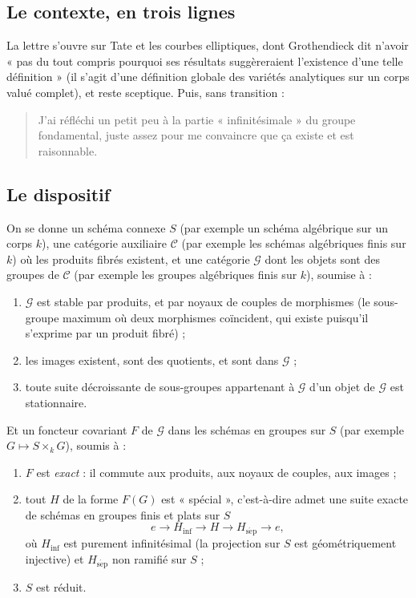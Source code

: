\documentclass[11pt,a4paper]{article}
\begin{document}
\subsection*{Le contexte, en trois lignes}

La lettre s'ouvre sur Tate et les courbes elliptiques, dont Grothendieck dit
n'avoir « pas du tout compris pourquoi ses résultats suggèreraient l'existence
d'une telle définition » (il s'agit d'une définition globale des variétés
analytiques sur un corps valué complet), et reste sceptique. Puis, sans
transition :

\begin{quote}
J'ai réfléchi un petit peu à la partie « infinitésimale » du groupe
fondamental, juste assez pour me convaincre que ça existe et est raisonnable.
\end{quote}

\subsection*{Le dispositif}

On se donne un schéma connexe $S$ (par exemple un schéma algébrique sur un
corps $k$), une catégorie auxiliaire $\mathcal{C}$ (par exemple les schémas
algébriques finis sur $k$) où les produits fibrés existent, et une catégorie
$\mathcal{G}$ dont les objets sont des groupes de $\mathcal{C}$ (par exemple
les groupes algébriques finis sur $k$), soumise à :

\begin{enumerate}
  \item[(i)] $\mathcal{G}$ est stable par produits, et par noyaux de couples de
    morphismes (le sous-groupe maximum où deux morphismes coïncident, qui
    existe puisqu'il s'exprime par un produit fibré) ;
  \item[(ii)] les images existent, sont des quotients, et sont dans
    $\mathcal{G}$ ;
  \item[(iii)] toute suite décroissante de sous-groupes appartenant à
    $\mathcal{G}$ d'un objet de $\mathcal{G}$ est stationnaire.
\end{enumerate}

Et un foncteur covariant $F$ de $\mathcal{G}$ dans les schémas en groupes sur
$S$ (par exemple $G \mapsto S \times_{k} G$), soumis à :

\begin{enumerate}
  \item[(iv)] $F$ est \emph{exact} : il commute aux produits, aux noyaux de
    couples, aux images ;
  \item[(v)] tout $H$ de la forme $F(G)$ est « spécial », c'est-à-dire admet
    une suite exacte de schémas en groupes finis et plats sur $S$
    \[
      e \longrightarrow H_{\mathrm{inf}} \longrightarrow H \longrightarrow
      H_{\mathrm{s\acute{e}p}} \longrightarrow e ,
    \]
    où $H_{\mathrm{inf}}$ est purement infinitésimal (la projection sur $S$
    est géométriquement injective) et $H_{\mathrm{s\acute{e}p}}$ non ramifié
    sur $S$ ;
  \item[(vi)] $S$ est réduit.
\end{enumerate}
\end{document}
